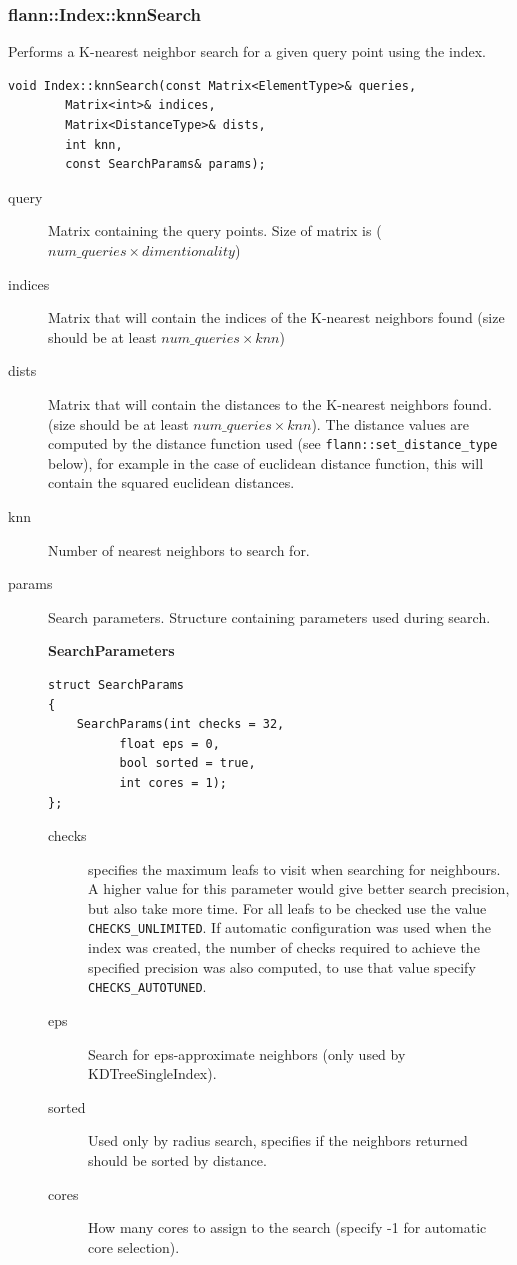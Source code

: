 \documentclass[letter,10pt]{article}
\begin{document}
\subsubsection{flann::Index::knnSearch}
Performs a K-nearest neighbor search for a given query point using the index.
\begin{Verbatim}[fontsize=\footnotesize,frame=single]
void Index::knnSearch(const Matrix<ElementType>& queries,
		Matrix<int>& indices, 
		Matrix<DistanceType>& dists,
		int knn,
		const SearchParams& params);
\end{Verbatim}
\begin{description}
\item[query]{Matrix containing the query points. Size of matrix is ($num\_queries \times dimentionality $)}
\item[indices]{Matrix that will contain the indices of the K-nearest neighbors found (size should be at least $num\_queries \times knn$)}
\item[dists]{Matrix that will contain the distances to the K-nearest neighbors found. (size should be at least $num\_queries \times knn$). The distance values are computed by the distance function used (see \texttt{flann::set\_distance\_type} below), for example in the case of euclidean distance function, this will contain the squared euclidean distances.}
\item[knn]{Number of nearest neighbors to search for.}
\item[params]{Search parameters.} Structure containing parameters used during search.

\textbf{SearchParameters}
\begin{Verbatim}[fontsize=\footnotesize]
struct SearchParams
{
	SearchParams(int checks = 32,
		  float eps = 0,
		  bool sorted = true,
		  int cores = 1);
};
\end{Verbatim}
\begin{description}
 \item[checks] specifies the maximum leafs to visit when searching for neighbours. A
higher value for this parameter would give better search precision, but
also take more time. For all leafs to be checked use the value \texttt{CHECKS\_UNLIMITED}.
If automatic configuration was used when the index was created, the number of checks 
required to achieve the specified precision was also computed, to use that value specify \texttt{CHECKS\_AUTOTUNED}.
 \item[eps] Search for eps-approximate neighbors (only used by KDTreeSingleIndex).
 \item[sorted] Used only by radius search, specifies if the neighbors returned should be sorted by distance.
 \item[cores] How many cores to assign to the search (specify -1 for automatic core selection).
\end{description}
\end{description}
\end{document}
